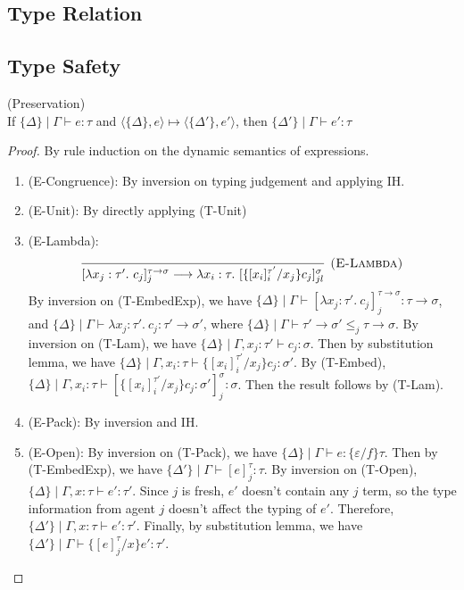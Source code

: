 \subsection{Type Relation}

\subsection{Type Safety}
\begin{lemma} (Preservation)\\
If $\{\Delta\} \mid \Gamma \vdash e : \tau$ and $\langle \{\Delta\}, e\rangle \mapsto \langle \{\Delta'\}, e'\rangle$, then $\{\Delta'\} \mid \Gamma \vdash e' : \tau$
\begin{proof}
By rule induction on the dynamic semantics of expressions. 
\begin{enumerate}
\item (E-Congruence): By inversion on typing judgement and applying IH.
\item (E-Unit): By directly applying (T-Unit)
\item (E-Lambda): 
$$\infer[\textsc{(E-Lambda)}]
  {[\lambda x_j : \tau'.\ c_j]^{\tau \rightarrow \sigma}_{j} \longrightarrow \lambda x_i : \tau.\ [\{[x_i]^{\tau'}_{i}/x_j\}c_j]^\sigma_{jl}}
  {}$$
By inversion on (T-EmbedExp), we have $\{\Delta\} \mid \Gamma \vdash  [\lambda x_j : \tau'.\ c_j]^{\tau \rightarrow \sigma}_{j}: \tau \rightarrow \sigma$, and $\{\Delta\} \mid \Gamma \vdash \lambda x_j : \tau'.\ c_j : \tau' \rightarrow \sigma'$, where $\{\Delta\} \mid \Gamma \vdash \tau' \rightarrow \sigma' \leq_j \tau \rightarrow \sigma$. By inversion on (T-Lam), we have $\{\Delta\} \mid \Gamma, x_j : \tau' \vdash c_j : \sigma$. Then by substitution lemma, we have $\{\Delta\} \mid \Gamma, x_i : \tau  \vdash \{[x_i]^{\tau'}_i/x_j\}c_j : \sigma'$. By (T-Embed), 
$\{\Delta\} \mid \Gamma, x_i : \tau  \vdash [\{[x_i]^{\tau'}_i/x_j\}c_j : \sigma']^{\sigma}_j : \sigma$. Then the result follows by (T-Lam).

\item (E-Pack): By inversion and IH.
\item (E-Open): By inversion on (T-Pack), we have $\{\Delta\} \mid \Gamma \vdash e : \{\varepsilon /f\} \tau$. Then by (T-EmbedExp), we have $\{\Delta'\} \mid \Gamma \vdash [e]^\tau_j : \tau$. By inversion on (T-Open), $\{\Delta\} \mid \Gamma, x : \tau \vdash e' : \tau'$. Since $j$ is fresh, $e'$ doesn't contain any $j$ term, so the type information from agent $j$ doesn't affect the typing of $e'$. Therefore, $\{\Delta'\} \mid \Gamma, x : \tau \vdash e' : \tau'$. Finally, by substitution lemma, we have $\{\Delta'\} \mid \Gamma \vdash \{[e]^\tau_j / x \}e' : \tau'$.


\end{enumerate}
\end{proof}
\end{lemma}
